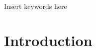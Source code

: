 \documentclass[conference]{IEEEtran}
\begin{document}

\begin{IEEEkeywords}

Insert keywords here

\end{IEEEkeywords}


\section{Introduction}
\end{document}
